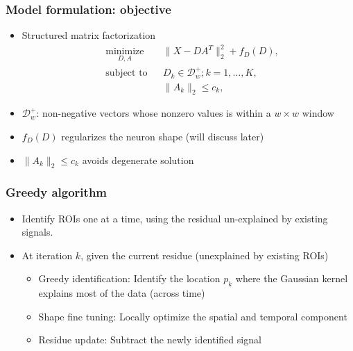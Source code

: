 \documentclass[16pt,presentation]{beamer}
\begin{document}
\begin{frame}
\frametitle{Model formulation: objective}
\begin{itemize}
\item Structured matrix factorization
\[
\begin{aligned}
& \underset{D, A}{\text{minimize}}
& & \| X - D A^T \|_2^2 + f_D(D), \\
& \text{subject to}
& & D_k \in \mathcal{D}_{w}^+; k = 1, \ldots, K,\\
& 
& & \|A_k\|_2 \leq c_k,
\end{aligned}
\]
\item $\mathcal{D}_{w}^+$: non-negative vectors whose nonzero values is within a $w \times w$ window
\item $f_D(D)$ regularizes the neuron shape (will discuss later)
\item $\|A_k\|_2 \leq c_k$ avoids degenerate solution
\end{itemize}
\end{frame}


\begin{frame}
\frametitle{Greedy algorithm}
\begin{itemize}
\item Identify ROIs one at a time, using the residual un-explained by existing signals.
\item At iteration $k$, given the current residue (unexplained by existing ROIs)
\begin{itemize}
\item \alert{Greedy identification}: Identify the location $p_k$ where the Gaussian kernel explains most of the data (across time)
\item \alert{Shape fine tuning}: Locally optimize the spatial and temporal component
\item \alert{Residue update}: Subtract the newly identified signal
\end{itemize}
\end{itemize}
\end{frame}
\end{document}
